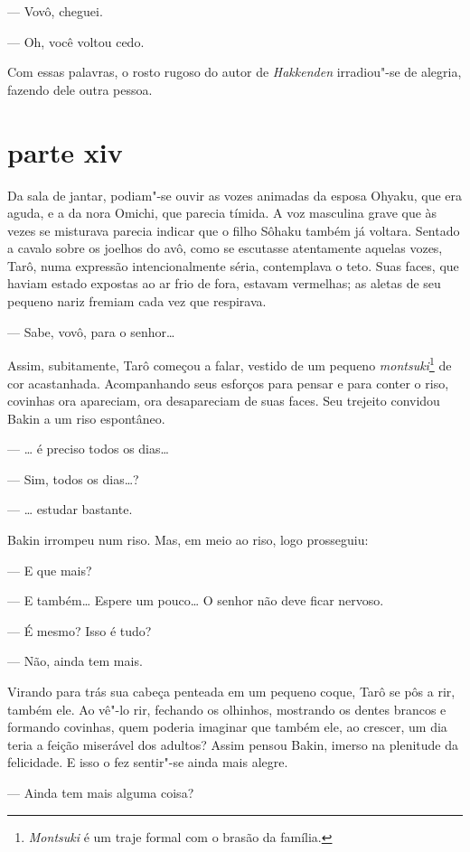 --- Vovô, cheguei.

--- Oh, você voltou cedo.

Com essas palavras, o rosto rugoso do autor de \textit{Hakkenden}
irradiou"-se de alegria, fazendo dele outra pessoa.

\section*{parte xiv}

Da sala de jantar, podiam"-se ouvir as vozes animadas da esposa Ohyaku, que
era aguda, e a da nora Omichi, que parecia tímida. A voz masculina
grave que às vezes se misturava parecia indicar que o filho Sôhaku
também já voltara. Sentado a cavalo sobre os joelhos do avô, como se
escutasse atentamente aquelas vozes, Tarô, numa expressão
intencionalmente séria, contemplava o teto. Suas faces, que haviam
estado expostas ao ar frio de fora, estavam vermelhas; as aletas de seu
pequeno nariz fremiam cada vez que respirava.

--- Sabe, vovô, para o senhor\ldots{}

Assim, subitamente, Tarô começou a falar, vestido de um pequeno
\textit{montsuki}\footnote{ \textit{Montsuki} é um traje formal
com o brasão da família.} de cor acastanhada. Acompanhando seus
esforços para pensar e para conter o riso, covinhas ora apareciam, ora
desapareciam de suas faces. Seu trejeito convidou Bakin a um riso
espontâneo.

--- \ldots{} é preciso todos os dias\ldots{}

--- Sim, todos os dias\ldots{}?

--- \ldots{} estudar bastante.

Bakin irrompeu num riso. Mas, em meio ao riso, logo prosseguiu:

--- E que mais?

--- E também\ldots{} Espere um pouco\ldots{} O senhor não deve ficar nervoso.

--- É mesmo? Isso é tudo?

--- Não, ainda tem mais.

Virando para trás sua cabeça penteada em um pequeno coque, Tarô se pôs a
rir, também ele. Ao vê"-lo rir, fechando os olhinhos, mostrando os
dentes brancos e formando covinhas, quem poderia imaginar que também
ele, ao crescer, um dia teria a feição miserável dos adultos? Assim
pensou Bakin, imerso na plenitude da felicidade. E isso o fez sentir"-se
ainda mais alegre.

--- Ainda tem mais alguma coisa?

